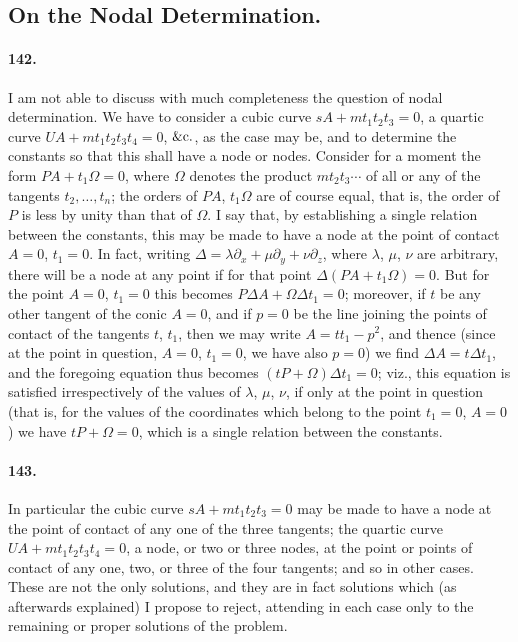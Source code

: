 \documentclass[11pt,a4paper]{article}
\begin{document}
\subsection*{On the Nodal Determination.}

\paragraph{142.}
I am not able to discuss with much completeness the question of nodal
determination. We have to consider a cubic curve $sA + m t_1 t_2 t_3 = 0$,
a quartic curve $UA + m t_1 t_2 t_3 t_4 = 0$, $\&{\rm c}.$, as the case
may be, and to determine the constants so that this shall have a node or
nodes. Consider for a moment the form $PA + t_1 \Omega = 0$, where
$\Omega$ denotes the product $m t_2 t_3 \dotsm$ of all or any of the
tangents $t_2, \dotsc, t_n$; the orders of $PA$, $t_1 \Omega$ are of
course equal, that is, the order of $P$ is less by unity than that of
$\Omega$. I say that, by establishing a single relation between the
constants, this may be made to have a node at the point of contact
$A = 0$, $t_1 = 0$. In fact, writing
$\Delta = \lambda \partial_x + \mu \partial_y + \nu \partial_z$, where
$\lambda$, $\mu$, $\nu$ are arbitrary, there will be a node at any point
if for that point $\Delta(PA + t_1 \Omega) = 0$. But for the point
$A = 0$, $t_1 = 0$ this becomes $P \Delta A + \Omega \Delta t_1 = 0$;
moreover, if $t$ be any other tangent of the conic $A = 0$, and if
$p = 0$ be the line joining the points of contact of the tangents $t$,
$t_1$, then we may write $A = t t_1 - p^2$, and thence (since at the
point in question, $A = 0$, $t_1 = 0$, we have also $p = 0$) we find
$\Delta A = t \Delta t_1$, and the foregoing equation thus becomes
$(t P + \Omega) \Delta t_1 = 0$; viz., this equation is satisfied
irrespectively of the values of $\lambda$, $\mu$, $\nu$, if only at the
point in question (that is, for the values of the coordinates which
belong to the point $t_1 = 0$, $A = 0$) we have $t P + \Omega = 0$, which
is a single relation between the constants.

\paragraph{143.}
In particular the cubic curve $sA + m t_1 t_2 t_3 = 0$ may be made to
have a node at the point of contact of any one of the three tangents; the
quartic curve $UA + m t_1 t_2 t_3 t_4 = 0$, a node, or two or three nodes,
at the point or points of contact of any one, two, or three of the four
tangents; and so in other cases. These are not the only solutions, and
they are in fact solutions which (as afterwards explained) I propose to
reject, attending in each case only to the remaining or proper solutions
of the problem.
\end{document}
